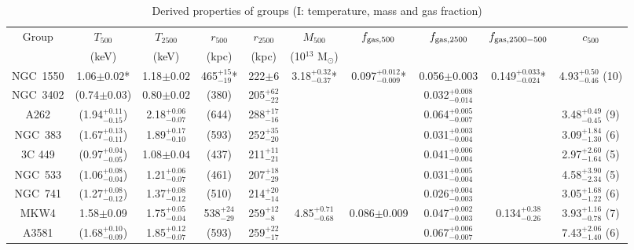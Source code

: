 \begin{table}
    \begin{center}
    \caption{Derived properties of groups (I: temperature, mass and gas fraction)}
    \vspace{0.3cm}
    {\tiny
    \begin{tabular}{cccccccccc} \hline \hline
    Group & $T_{500}$\tablenotemark{a} & $T_{2500}$ & $r_{500}$\tablenotemark{a} & $r_{2500}$ & $M_{500}$\tablenotemark{a} & $f_{\rm gas, 500}$\tablenotemark{a} & $f_{\rm gas, 2500}$ & $f_{\rm gas, 2500-500}$\tablenotemark{a} & $c_{500}$\tablenotemark{b} \\
          & (keV) & (keV) & (kpc) & (kpc) & (10$^{13}$ M$_{\odot}$) & & & & \\
    NGC~1550 & 1.06$\pm0.02$* & 1.18$\pm0.02$ & 465$^{+15}_{-19}$* & 222$\pm6$ & 3.18$^{+0.32}_{-0.37}$* & 0.097$^{+0.012}_{-0.009}$* & 0.056$\pm$0.003 & 0.149$^{+0.033}_{-0.024}$* & 4.93$^{+0.50}_{-0.46}$ (10) \\
    NGC~3402 & (0.74$\pm0.03$)& 0.80$\pm0.02$ & (380) & 205$^{+62}_{-22}$ & & & 0.032$^{+0.008}_{-0.014}$ & & \\
    A262     & (1.94$^{+0.11}_{-0.15}$) & 2.18$^{+0.06}_{-0.07}$ & (644) & 288$^{+17}_{-16}$ & & & 0.064$^{+0.005}_{-0.007}$ & & 3.48$^{+0.49}_{-0.45}$ (9) \\
    NGC~383  & (1.67$^{+0.13}_{-0.11}$) & 1.89$^{+0.17}_{-0.10}$ & (593) & 252$^{+35}_{-20}$ & & & 0.031$^{+0.003}_{-0.004}$ & & 3.09$^{+1.84}_{-1.30}$ (6) \\
    3C 449   & (0.97$^{+0.04}_{-0.05}$) & 1.08$\pm0.04$ & (437) & 211$^{+11}_{-21}$ & & & 0.041$^{+0.006}_{-0.004}$ & & 2.97$^{+2.60}_{-1.64}$ (5) \\
    NGC~533  & (1.06$^{+0.08}_{-0.04}$) & 1.21$^{+0.06}_{-0.07}$ & (461) & 207$^{+18}_{-29}$ & & & 0.031$^{+0.005}_{-0.004}$ & & 4.58$^{+3.90}_{-2.34}$ (5) \\
    NGC~741  & (1.27$^{+0.08}_{-0.12}$) & 1.37$^{+0.08}_{-0.12}$ & (510) & 214$^{+20}_{-14}$ & & & 0.026$^{+0.004}_{-0.003}$ & & 3.05$^{+1.68}_{-1.22}$ (6) \\
    MKW4     & 1.58$\pm$0.09 & 1.75$^{+0.05}_{-0.04}$ & 538$^{+24}_{-29}$ & 259$^{+12}_{-8}$ & 4.85$^{+0.71}_{-0.68}$ & 0.086$\pm$0.009 & 0.047$^{+0.002}_{-0.003}$ & 0.134$^{+0.38}_{-0.26}$ & 3.93$^{+1.16}_{-0.78}$ (7) \\
    A3581    & (1.68$^{+0.10}_{-0.09}$) & 1.85$^{+0.12}_{-0.07}$ & (593) & 259$^{+22}_{-17}$ & & & 0.067$^{+0.006}_{-0.007}$ & & 7.43$^{+2.06}_{-1.40}$ (6) \\

\end{tabular}}
\end{center}
\end{table}
